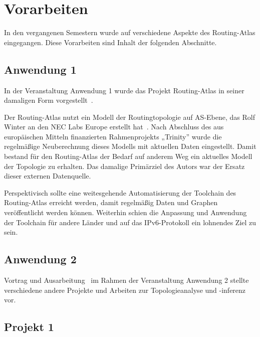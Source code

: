\section{Vorarbeiten}\label{sec:previous}

In den vergangenen Semestern wurde auf verschiedene Aspekte des Routing-Atlas eingegangen.
Diese Vorarbeiten sind Inhalt der folgenden Abschnitte.

\subsection{Anwendung 1}
In der Veranstaltung Anwendung 1 wurde das Projekt Routing-Atlas in seiner damaligen Form vorgestellt~\cite{KrohnAW1}.

Der Routing-Atlas nutzt ein Modell der Routingtopologie auf AS-Ebene, das Rolf Winter an den NEC Labs Europe erstellt hat~\cite{neclab-topology, Winter:2009:MIR:1577959.1577976}.
Nach Abschluss des aus europäischen Mitteln finanzierten Rahmenprojekts „Trinity” wurde die regelmäßige Neuberechnung dieses Modells mit aktuellen Daten eingestellt.
Damit bestand für den Routing-Atlas der Bedarf auf anderem Weg ein aktuelles Modell der Topologie zu erhalten.
Das damalige Primärziel des Autors war der Ersatz dieser externen Datenquelle.

Perspektivisch sollte eine weitesgehende Automatisierung der Toolchain des Routing-Atlas erreicht werden, damit regelmäßig Daten und Graphen veröffentlicht werden können.
Weiterhin schien die Anpassung und Anwendung der Toolchain für andere Länder und auf das IPv6-Protokoll ein lohnendes Ziel zu sein.

\subsection{Anwendung 2}
Vortrag und Ausarbeitung~\cite{KrohnAW2} im Rahmen der Veranstaltung Anwendung 2 stellte verschiedene andere Projekte und Arbeiten zur Topologieanalyse und -inferenz vor.


\subsection{Projekt 1}

